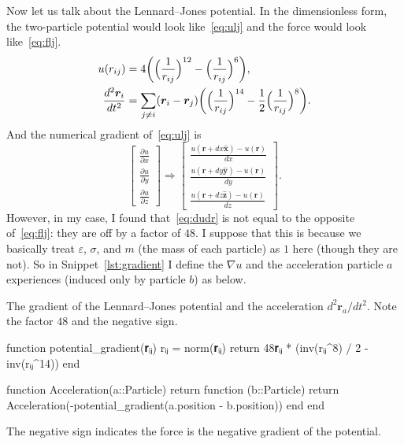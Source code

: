 Now let us talk about the Lennard--Jones potential. In the dimensionless form,
the two-particle potential would look like~\eqref{eq:ulj} and the force would
look like~\eqref{eq:flj}.
%
\begin{align}
    u(r_{ij})                      & = 4 \biggl( \Bigl( \frac{ 1 }{ r_{ij} } \Bigr)^{12}
    -\Bigl( \frac{ 1 }{ r_{ij} } \Bigr)^6 \biggr), \label{eq:ulj}                        \\
    \frac{ d^2 \bm{r}_i }{ d t^2 } & = \sum_{j \neq i} (\bm{r}_i - \bm{r}_j)
    \biggl( \Bigl( \frac{ 1 }{ r_{ij} } \Bigr)^{14}
    -\frac{ 1 }{ 2 } \Bigl( \frac{ 1 }{ r_{ij} } \Bigr)^8 \biggr). \label{eq:flj}
\end{align}
%
And the numerical gradient of~\eqref{eq:ulj} is
%
\begin{equation}\label{eq:dudr}
    \begin{bmatrix}
        \frac{ \partial u }{ \partial x } \\
        \frac{ \partial u }{ \partial y } \\
        \frac{ \partial u }{ \partial z }
    \end{bmatrix}
    \Rightarrow
    \begin{bmatrix}
        \frac{ u(\bm{r} + dx \hat{\bm{x}}) - u(\bm{r}) }{ dx } \\
        \frac{ u(\bm{r} + dy \hat{\bm{y}}) - u(\bm{r}) }{ dy } \\
        \frac{ u(\bm{r} + dz \hat{\bm{z}}) - u(\bm{r}) }{ dz }
    \end{bmatrix}.
\end{equation}
%
However, in my case, I found that~\eqref{eq:dudr} is not equal to the opposite
of~\eqref{eq:flj}: they are off by a factor of $48$.
I suppose that this is because we basically treat
$\varepsilon$, $\sigma$, and $m$ (the mass of each particle) as $1$ here (though they
are not). So in Snippet~\ref{lst:gradient} I define the $\nabla u$ and the acceleration
particle $a$ experiences (induced only by particle $b$) as below.
%
\begin{algorithm}
    \caption{The gradient of the Lennard--Jones potential and the acceleration
        $d^2 \bm{r}_a / d t^2$. Note the factor $48$ and the negative sign.}
    \label{lst:gradient}
    \begin{juliacode}
        function potential_gradient(𝐫ᵢⱼ)
            rᵢⱼ = norm(𝐫ᵢⱼ)
            return 48𝐫ᵢⱼ * (inv(rᵢⱼ^8) / 2 - inv(rᵢⱼ^14))
        end

        function Acceleration(a::Particle)
            return function (b::Particle)
                return Acceleration(-potential_gradient(a.position - b.position))
            end
        end
    \end{juliacode}
\end{algorithm}

The negative sign indicates the force is the negative gradient of the potential.

